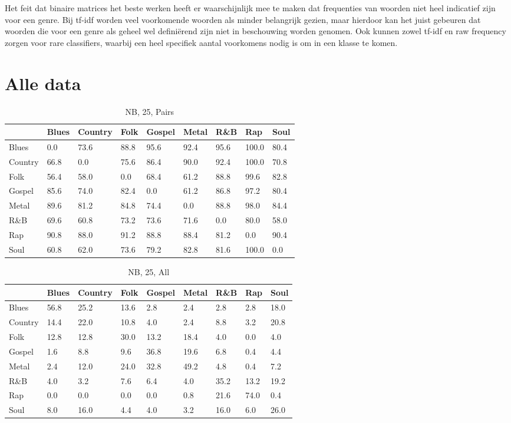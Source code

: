 \documentclass[a4paper,oneside]{article}
\begin{document}
Het feit dat binaire matrices het beste werken heeft er waarschijnlijk mee te maken dat frequenties van woorden niet heel indicatief zijn voor een genre. Bij tf-idf worden veel voorkomende woorden als minder belangrijk gezien, maar hierdoor kan het juist gebeuren dat woorden die voor een genre als geheel wel defini\"erend zijn niet in beschouwing worden genomen. Ook kunnen zowel tf-idf en raw frequency zorgen voor rare classifiers, waarbij een heel specifiek aantal voorkomens nodig is om in een klasse te komen.

\section{Alle data}
\begin{table}[H]\centering
\caption{NB, 25, Pairs}
\begin{tabu}{l|*{8}{l}}
 & Blues & Country & Folk & Gospel & Metal & R\&B & Rap & Soul \\ \hline
Blues & 0.0 & 73.6 & 88.8 & 95.6 & 92.4 & 95.6 & 100.0 & 80.4 \\
Country & 66.8 & 0.0 & 75.6 & 86.4 & 90.0 & 92.4 & 100.0 & 70.8 \\
Folk & 56.4 & 58.0 & 0.0 & 68.4 & 61.2 & 88.8 & 99.6 & 82.8 \\
Gospel & 85.6 & 74.0 & 82.4 & 0.0 & 61.2 & 86.8 & 97.2 & 80.4 \\
Metal & 89.6 & 81.2 & 84.8 & 74.4 & 0.0 & 88.8 & 98.0 & 84.4 \\
R\&B & 69.6 & 60.8 & 73.2 & 73.6 & 71.6 & 0.0 & 80.0 & 58.0 \\
Rap & 90.8 & 88.0 & 91.2 & 88.8 & 88.4 & 81.2 & 0.0 & 90.4 \\
Soul & 60.8 & 62.0 & 73.6 & 79.2 & 82.8 & 81.6 & 100.0 & 0.0 \\
\end{tabu}
\end{table}

\begin{table}[H]\centering
\caption{NB, 25, All}
\begin{tabu}{l|*{8}{l}}
&Blues & Country & Folk & Gospel & Metal & R\&B & Rap & Soul \\ \hline
Blues & 56.8 & 25.2 & 13.6 & 2.8 & 2.4 & 2.8 & 2.8 & 18.0 \\
Country & 14.4 & 22.0 & 10.8 & 4.0 & 2.4 & 8.8 & 3.2 & 20.8 \\
Folk & 12.8 & 12.8 & 30.0 & 13.2 & 18.4 & 4.0 & 0.0 & 4.0 \\
Gospel & 1.6 & 8.8 & 9.6 & 36.8 & 19.6 & 6.8 & 0.4 & 4.4 \\
Metal & 2.4 & 12.0 & 24.0 & 32.8 & 49.2 & 4.8 & 0.4 & 7.2 \\
R\&B & 4.0 & 3.2 & 7.6 & 6.4 & 4.0 & 35.2 & 13.2 & 19.2 \\
Rap & 0.0 & 0.0 & 0.0 & 0.0 & 0.8 & 21.6 & 74.0 & 0.4 \\
Soul & 8.0 & 16.0 & 4.4 & 4.0 & 3.2 & 16.0 & 6.0 & 26.0 \\
\end{tabu}
\end{table}
\end{document}
